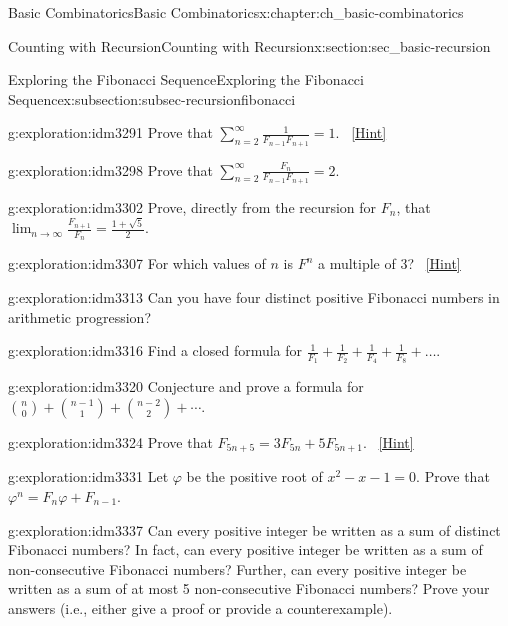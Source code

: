 \documentclass[oneside,10pt,]{book}
\numberwithin{equation}{chapter}
\begin{document}
\begin{chapterptx}{Basic Combinatorics}{}{Basic Combinatorics}{}{}{x:chapter:ch_basic-combinatorics}
\begin{sectionptx}{Counting with Recursion}{}{Counting with Recursion}{}{}{x:section:sec_basic-recursion}
\begin{subsectionptx}{Exploring the Fibonacci Sequence}{}{Exploring the Fibonacci Sequence}{}{}{x:subsection:subsec-recursionfibonacci}
\begin{exploration}{}{g:exploration:idm3291}
Prove that \(\sum_{n = 2}^{\infty}\frac{1}{F_{n - 1}F_{n + 1}} = 1\).%
\qquad~\hfill{\tiny\hyperlink{g:hint:idm3295-back}{[Hint]}}\end{exploration}
\begin{exploration}{}{g:exploration:idm3298}%
Prove that \(\sum_{n = 2}^{\infty}\frac{F_{n}}{F_{n - 1}F_{n + 1}} = 2.\)%
\end{exploration}
\begin{exploration}{}{g:exploration:idm3302}%
Prove, directly from the recursion for \(F_n\), that \(\lim_{n\to\infty}\frac{F_{n + 1}}{F_{n}} = \frac{1 + \sqrt{5}}{2}.\)%
\end{exploration}
\begin{exploration}{}{g:exploration:idm3307}%
For which values of \(n\) is \(F^{n}\) a multiple of 3?%
\qquad~\hfill{\tiny\hyperlink{g:hint:idm3312-back}{[Hint]}}\end{exploration}
\begin{exploration}{}{g:exploration:idm3313}%
Can you have four distinct positive Fibonacci numbers in arithmetic progression?%
\end{exploration}
\begin{exploration}{}{g:exploration:idm3316}%
Find a closed formula for \(\frac{1}{F_{1}} + \frac{1}{F_{2}} + \frac{1}{F_{4}} + \frac{1}{F_{8}} + \ldots.\)%
\end{exploration}
\begin{exploration}{}{g:exploration:idm3320}%
Conjecture and prove a formula for \(\binom{n}{0} + \binom{n-1}{1} + \binom{n-2}{2} + \cdots\).%
\end{exploration}
\begin{exploration}{}{g:exploration:idm3324}%
Prove that \(F_{5n + 5} = 3F_{5n} + 5F_{5n + 1}\).%
\qquad~\hfill{\tiny\hyperlink{g:hint:idm3328-back}{[Hint]}}\end{exploration}
\begin{exploration}{}{g:exploration:idm3331}%
Let \(\varphi\) be the positive root of \(x^{2} - x - 1 = 0\). Prove that \(\varphi^{n} = F_{n}\varphi + F_{n - 1}\).%
\end{exploration}
\begin{exploration}{}{g:exploration:idm3337}%
Can every positive integer be written as a sum of distinct Fibonacci numbers?  In fact, can every positive integer be written as a sum of non-consecutive Fibonacci numbers?  Further, can every positive integer be written as a sum of at most 5 non-consecutive Fibonacci numbers?  Prove your answers (i.e., either give a proof or provide a counterexample).%

\end{exploration}
\end{subsectionptx}
\end{sectionptx}
\end{chapterptx}
\end{document}
